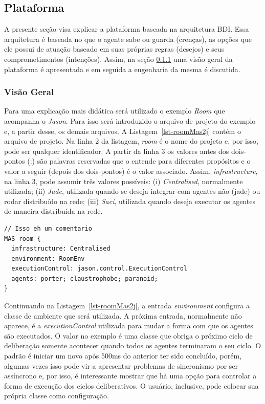 \subsection{Plataforma \jason} \label{sec:aoppj}

A presente seção visa explicar a plataforma \jason baseada na arquitetura BDI.
Essa arquitetura é baseada no que o agente sabe ou guarda (crenças), as opções
que ele possui de atuação baseado em suas próprias regras (desejos) e seus
comprometimentos (intenções). Assim, na seção \ref{sec-jason-overview} uma
visão geral da plataforma é apresentada e em seguida a engenharia da mesma é
discutida.

\subsubsection{Visão Geral} \label{sec-jason-overview}

Para uma explicação mais didática será utilizado o exemplo \emph{Room} que
acompanha o \emph{Jason}. Para isso será introduzido
o arquivo de projeto do exemplo e, a partir desse, os demais arquivos.
A Listagem~\ref{lst-roomMas2j} contém o arquivo de projeto.
Na linha 2 da listagem, \emph{room} é o nome do projeto e, por isso, pode ser qualquer
identificador. A partir da linha 3 os valores antes dos dois-pontos (:)
são palavras reservadas que o \jason entende para diferentes propósitos e o valor
a seguir (depois dos dois-pontos) é o valor associado.
Assim, \emph{infrastructure}, na linha 3, pode assumir três valores
possíveis: (i) \emph{Centralised}, normalmente utilizada;
(ii) \emph{Jade}, utilizada quando se deseja integrar
com agentes não \jason (jade) ou rodar distribuído na rede; (iii) \emph{Saci}, utilizada
quando deseja executar os agentes de maneira distribuída na rede.

\begin{center}
    \begin{minipage}{120mm}
	\lstset{linewidth=120mm}
	\begin{lstlisting}[frame=trbl, caption=Arquivo de projeto do \jason para o exemplo \emph{Room}, label=lst-roomMas2j]
// Isso eh um comentario
MAS room {
  infrastructure: Centralised
  environment: RoomEnv
  executionControl: jason.control.ExecutionControl
  agents: porter; claustrophobe; paranoid;
}
	\end{lstlisting}
    \end{minipage}
\end{center}

Continuando na Listagem~\ref{lst-roomMas2j}, a entrada \emph{environment}
configura a classe de ambiente que será utilizada. A próxima entrada,
normalmente não aparece, é a \emph{executionControl} utilizada para
mudar a forma com que os agentes são executados. O valor no exemplo é uma
classe que obriga o próximo ciclo de deliberação somente acontecer quando
todos os agentes terminaram o seu ciclo. O padrão é iniciar um novo
após 500ms do anterior ter sido concluído, porém, algumas vezes isso
pode vir a apresentar problemas de sincronismo por ser assíncrono e, por isso, é interessante
mostrar que há uma opção para controlar a forma de execução dos ciclos
deliberativos. O usuário, inclusive, pode colocar sua própria classe como
configuração.

